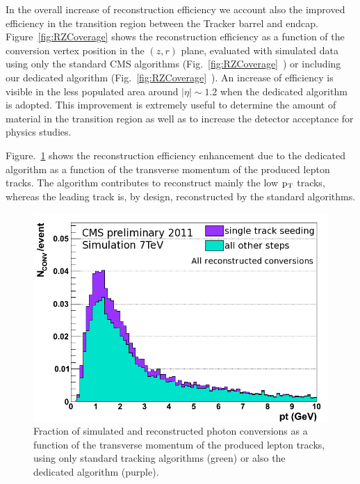 \documentclass[a4paper]{jpconf}
\begin{document}
In the overall increase of reconstruction efficiency we account also the improved efficiency in the transition region between the Tracker barrel and endcap.  
Figure~\ref{fig:RZCoverage} shows the reconstruction efficiency as a function of the conversion vertex position in the $(z,r)$ plane, evaluated with simulated data using only the standard CMS algorithms (Fig.~\ref{fig:RZCoverage}~) or including our dedicated algorithm (Fig.~\ref{fig:RZCoverage}~). An increase of efficiency is visible in the less populated area around $|\eta| \sim 1.2$ when the dedicated algorithm is adopted. This improvement is extremely useful to determine  the amount of material in the transition region as well as to increase the detector acceptance for physics studies.



Figure.~\ref{fig:ptPerf} shows the reconstruction efficiency enhancement due to the  dedicated algorithm as a function of the transverse momentum of the produced lepton tracks. The algorithm contributes to reconstruct mainly the low $\rm p_T$ tracks, whereas the leading track is, by design, reconstructed by the standard algorithms.

\begin{figure}[h]
\begin{center}
\includegraphics[width=.7\textwidth]{fig/algo_pt_Lin_Reco_All_mod.png}
\caption{\label{fig:ptPerf}
Fraction of simulated and reconstructed photon conversions as a function of the transverse momentum of the produced lepton tracks, using only standard tracking algorithms (green) or also the dedicated algorithm (purple). }
\end{center}
\end{figure}
\end{document}
